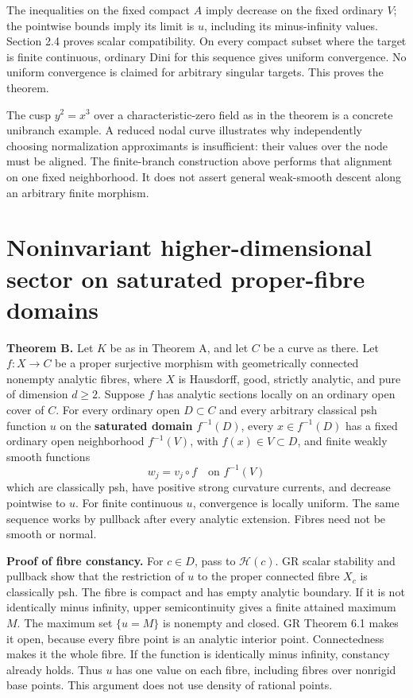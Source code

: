\documentclass[11pt]{article}
\begin{document}
The inequalities on the fixed compact \(A\) imply decrease on the fixed ordinary \(V\); the pointwise bounds imply its limit is \(u\), including its minus-infinity values. Section 2.4 proves scalar compatibility. On every compact subset where the target is finite continuous, ordinary Dini for this sequence gives uniform convergence. No uniform convergence is claimed for arbitrary singular targets. This proves the theorem.

The cusp \(y^2=x^3\) over a characteristic-zero field as in the theorem is a concrete unibranch example. A reduced nodal curve illustrates why independently choosing normalization approximants is insufficient: their values over the node must be aligned. The finite-branch construction above performs that alignment on one fixed neighborhood. It does not assert general weak-smooth descent along an arbitrary finite morphism.

\section{Noninvariant higher-dimensional sector on saturated proper-fibre domains}

\textbf{Theorem B.} Let \(K\) be as in Theorem A, and let \(C\) be a curve as there. Let \(f:X\to C\) be a proper surjective morphism with geometrically connected nonempty analytic fibres, where \(X\) is Hausdorff, good, strictly analytic, and pure of dimension \(d\ge2\). Suppose \(f\) has analytic sections locally on an ordinary open cover of \(C\). For every ordinary open \(D\subset C\) and every arbitrary classical psh function \(u\) on the \textbf{saturated domain} \(f^{-1}(D)\), every \(x\in f^{-1}(D)\) has a fixed ordinary open neighborhood \(f^{-1}(V)\), with \(f(x)\in V\subset D\), and finite weakly smooth functions
\[
w_j=v_j\circ f\quad\text{on }f^{-1}(V)
\]
which are classically psh, have positive strong curvature currents, and decrease pointwise to \(u\). For finite continuous \(u\), convergence is locally uniform. The same sequence works by pullback after every analytic extension. Fibres need not be smooth or normal.

\textbf{Proof of fibre constancy.} For \(c\in D\), pass to \(\mathcal H(c)\). GR scalar stability and pullback show that the restriction of \(u\) to the proper connected fibre \(X_c\) is classically psh. The fibre is compact and has empty analytic boundary. If it is not identically minus infinity, upper semicontinuity gives a finite attained maximum \(M\). The maximum set \(\{u=M\}\) is nonempty and closed. GR Theorem 6.1 makes it open, because every fibre point is an analytic interior point. Connectedness makes it the whole fibre. If the function is identically minus infinity, constancy already holds. Thus \(u\) has one value on each fibre, including fibres over nonrigid base points. This argument does not use density of rational points.
\end{document}
